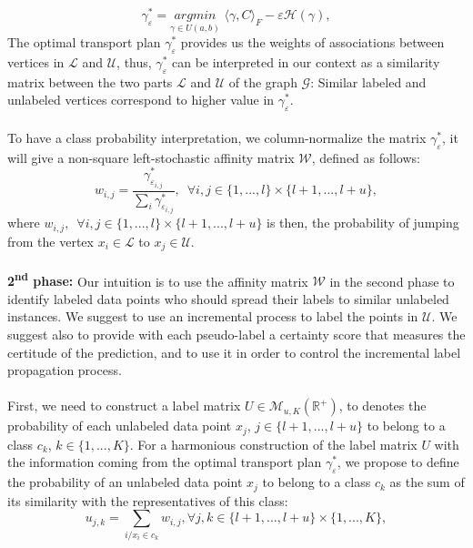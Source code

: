 \documentclass[conference]{IEEEtran}
\begin{document}
\begin{equation}
\gamma^*_\varepsilon = \underset{\gamma \in U(a,b)}{argmin} \,\, \langle {\gamma},{C} \rangle _F - \varepsilon \mathcal{H}(\gamma)   ,
\end{equation}
    The optimal transport plan $\gamma^*_\varepsilon$ provides us the weights of associations between vertices in $\mathcal{L}$ and $\mathcal{U}$, thus, $\gamma^*_\varepsilon$ can be interpreted in our context as a similarity matrix between the two parts $\mathcal{L}$ and $\mathcal{U}$ of the graph $\mathcal{G}$: Similar labeled and unlabeled vertices correspond to higher value in $\gamma^*_\varepsilon$.
\\
\\ To have a class probability interpretation, we column-normalize the matrix $\gamma^*_\varepsilon$, it will give a non-square left-stochastic affinity matrix $\mathcal{W}$, defined as follows:
\begin{equation}
w_{i,j} = \frac{\gamma^*_{\varepsilon_{i,j}}}{\sum_i \gamma^*_{\varepsilon_{i,j}}}, \, \, \, \forall i,j  \in \{1, ..., l\}\times\{l+1, ..., l+u \},
\end{equation}
where $w_{i,j},\, \, \,  \forall i,j  \in \{1, ..., l\} \times \{l+1, ..., l+u \}$ is then, the probability of jumping from the vertex $x_i \in \mathcal{L}$ to $x_j\in \mathcal{U}$.
\\
\\
\textbf{2\textsuperscript{nd} phase:} Our intuition is to use the affinity matrix  $\mathcal{W}$ in the second phase to identify labeled data points who should spread their labels to similar unlabeled instances. We suggest to use an incremental process to label the points in $\mathcal{U}$. We suggest also to provide with each pseudo-label a certainty score that measures the certitude of the prediction, and to use it in order to control the incremental label propagation process.
\\
\\ First, we need to construct a label matrix $U \in \mathcal{M}_{u,K}(\mathbb{R}^+)$, to denotes the probability of each unlabeled data point $x_j$, $j \in \{l+1, ..., l+u \}$ to belong to a class $c_k$, $k \in \{1, ..., K\}$. For a harmonious construction of the label matrix $U$ with the information coming from the optimal transport plan $\gamma^*_\varepsilon$, we propose to define the probability of an unlabeled data point $x_j$ to belong to a class $c_k$ as the sum of its similarity with the representatives of this class: 
\begin{equation}
u_{j,k} = \sum_{i / x_i \in c_k} w_{i,j} ,  \forall j,k \in \{l+1, ..., l+u \} \times \{1, ..., K\},
\end{equation}
\end{document}
